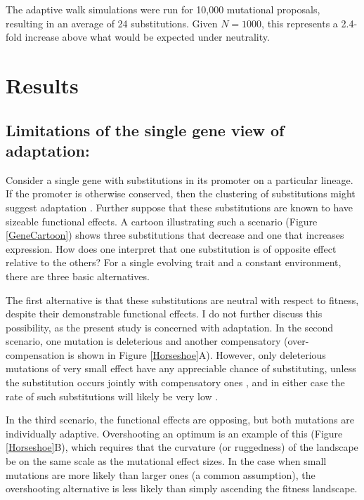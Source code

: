 \documentclass[dvips,12pt,twoside,titlepage]{article}
\begin{document}
The adaptive walk simulations were run for 10,000 mutational proposals, resulting in an average of 24 substitutions. Given $N = 1000$, this represents a 2.4-fold increase above what would be expected under neutrality.

\section*{Results}

\subsection*{Limitations of the single gene view of adaptation:}

Consider a single gene with substitutions in its promoter on a particular lineage.
If the promoter is otherwise conserved, then the clustering of substitutions might suggest adaptation \cite{Pollard:2006bd,Holloway:2008cn,Kim:2007p5775}.
Further suppose that these substitutions are known to have sizeable functional effects.
A cartoon illustrating such a scenario (Figure \ref{GeneCartoon}) shows three substitutions that decrease and one that increases expression.
How does one interpret that one substitution is of opposite effect relative to the others?
For a single evolving trait and a constant environment, there are three basic alternatives.

The first alternative is that these substitutions are neutral with respect to fitness, despite their demonstrable functional effects. I do not further discuss this possibility, as the present study is concerned with adaptation.
In the second scenario, one mutation is deleterious and another compensatory (over-compensation is shown in Figure \ref{Horseshoe}A). 
However, only deleterious mutations of very small effect have any appreciable chance of substituting, unless the substitution occurs jointly with compensatory ones \cite{Kimura:1985p1185}, and in either case the rate of such substitutions will likely be very low \cite{Stephan:1996wl,Ewens:2004fj,Iwasa:2004p1017,Durrett:2008p984}.

In the third scenario, the functional effects are opposing, but both mutations are individually adaptive. 
Overshooting an optimum is an example of this (Figure \ref{Horseshoe}B), which requires that the curvature (or ruggedness) of the landscape be on the same scale as the mutational effect sizes. 
In the case when small mutations are more likely than larger ones (a common assumption), the overshooting alternative is less likely than simply ascending the fitness landscape.
\end{document}
